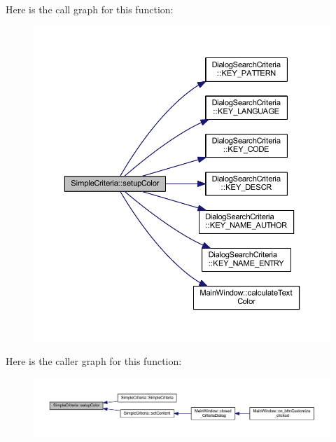 Here is the call graph for this function\+:
\nopagebreak
\begin{figure}[H]
\begin{center}
\leavevmode
\includegraphics[width=350pt]{class_simple_criteria_a57ee6f50514f21b0c275b74d5a4d4b81_cgraph}
\end{center}
\end{figure}




Here is the caller graph for this function\+:
\nopagebreak
\begin{figure}[H]
\begin{center}
\leavevmode
\includegraphics[width=350pt]{class_simple_criteria_a57ee6f50514f21b0c275b74d5a4d4b81_icgraph}
\end{center}
\end{figure}




